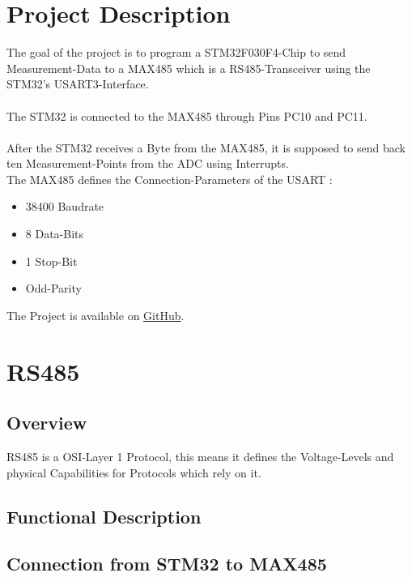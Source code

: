 \section{Project Description}
\label{sec:ProjDesc}

The goal of the project is to program a STM32F030F4-Chip to send Measurement-Data
to a MAX485 which is a RS485-Transceiver using the STM32's USART3-Interface.\\ \\
The STM32 is connected to the MAX485 through Pins PC10 and PC11.\\ \\
After the STM32 receives a Byte from the MAX485, it is supposed to send back
ten Measurement-Points from the ADC using Interrupts.\\
The MAX485 defines the Connection-Parameters of the USART :
\begin{itemize}
	\item 38400 Baudrate
	\item 8 Data-Bits
	\item 1 Stop-Bit
	\item Odd-Parity
\end{itemize}

The Project is available on \href{https://github.com/davirieser/uC_Comm}{GitHub}.

\section{RS485}
\label{sec:RS485}

\subsection{Overview}
\label{subsec:RS_Over}

RS485 is a OSI-Layer 1 Protocol, this means it defines the Voltage-Levels and
physical Capabilities for Protocols which rely on it.

\subsection{Functional Description}
\label{subsec:RS_FuncDes}

\subsection{Connection from STM32 to MAX485}
\label{subsec:RS_Conn}
